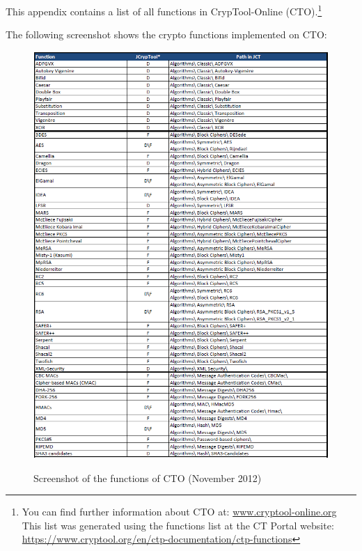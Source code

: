 \noindent This appendix contains a list of all
functions in CrypTool-Online (CTO).\footnote{%
  You can find further information about CTO at:
  \url{www.cryptool-online.org} \\
  This list was generated using the functions list at the CT Portal website:\\
  \url{https://www.cryptool.org/en/ctp-documentation/ctp-functions}}




\noindent The following screenshot shows the crypto functions implemented on CTO:
\clearpage
\begin{figure}[hb]
\begin{center}
\vspace{-30pt}
\includegraphics[scale=0.8, angle=0] {figures/JCT-functions-en-1}
\hypertarget{functions-overview-1-CTO}{}
\caption{Screenshot of the functions of CTO (November 2012)} 
\label{functions-overview-1-CTO}
\end{center}
\end{figure}
\clearpage

